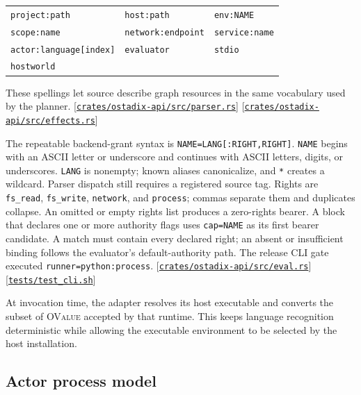 \documentclass[11pt,oneside]{article}
\newcommand{\ovalue}{{\mdseries\textsc{OValue}}}
\newcommand{\src}[1]{\textcolor{OSlate}{\scriptsize[\href{https://github.com/lostadi/OSTADIX/blob/c0b02c326b2329a95ba52447c7180bc93957cd57/#1}{\nolinkurl{#1}}]}\allowbreak}
\begin{document}
\begin{center}
\begin{tabular}{lll}
\texttt{project:path} & \texttt{host:path} & \texttt{env:NAME} \\
\texttt{scope:name} & \texttt{network:endpoint} & \texttt{service:name} \\
\texttt{actor:language[index]} & \texttt{evaluator} & \texttt{stdio} \\
\texttt{hostworld} & &
\end{tabular}
\end{center}

These spellings let source describe graph resources in the same vocabulary
used by the planner. \src{crates/ostadix-api/src/parser.rs}
\src{crates/ostadix-api/src/effects.rs}

The repeatable backend-grant syntax is
\texttt{NAME=LANG[:RIGHT,RIGHT]}. \texttt{NAME} begins with an ASCII letter or
underscore and continues with ASCII letters, digits, or underscores.
\texttt{LANG} is nonempty; known aliases canonicalize, and \texttt{*} creates
a wildcard. Parser dispatch still requires a registered source tag. Rights are
\texttt{fs\_read}, \texttt{fs\_write},
\texttt{network}, and \texttt{process}; commas separate them and duplicates
collapse. An omitted or empty rights list produces a zero-rights bearer. A
block that declares one or more authority flags uses \texttt{cap=NAME} as its
first bearer candidate. A match must contain every declared right; an absent
or insufficient binding follows the evaluator's default-authority path. The
release CLI gate executed
\texttt{runner=python:process}. \src{crates/ostadix-api/src/eval.rs}
\src{tests/test_cli.sh}

At invocation time, the adapter resolves its host executable and converts the
subset of \ovalue{} accepted by that runtime. This keeps language recognition
deterministic while allowing the executable environment to be selected by the
host installation.

\subsection{Actor process model}
\end{document}
